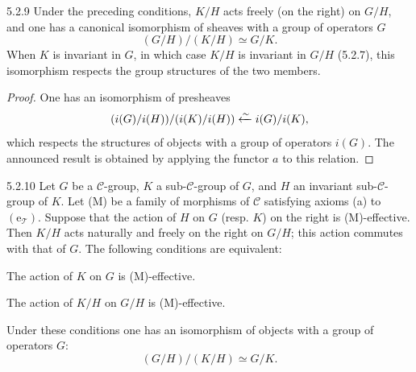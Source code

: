 \begin{proposition}{5.2.9}\label{IV.5.2.9}
Under the preceding conditions, \(K/H\) acts
freely (on the right) on \(G/H\), and one has
a canonical isomorphism of sheaves with a
group of operators \(G\)
\[
(G/H)/(K/H)\simeq G/K.
\]
When \(K\) is invariant in \(G\), in which case
\(K/H\) is invariant in \(G/H\) (5.2.7), this
isomorphism respects the group structures of
the two members.
\end{proposition}
\begin{proof}
One has an isomorphism of presheaves
\[
(i(G)/i(H))/(i(K)/i(H))\xleftarrow{\sim} i(G)/i(K),
\]
which respects the structures of objects with
a group of operators \(i(G)\).
The announced result is obtained by applying
the functor \(a\) to this relation.
\end{proof}
\begin{corollary}{5.2.10}\label{IV.5.2.10}
Let \(G\) be a \(\mathcal C\)-group, \(K\) a
sub-\(\mathcal C\)-group of \(G\), and \(H\)
an invariant sub-\(\mathcal C\)-group of \(K\).
Let (M) be a family of morphisms of \(\mathcal C\)
satisfying axioms (a) to \((\mathrm e_{\mathcal T})\).
Suppose that the action of \(H\) on \(G\)
(resp. \(K\)) on the right is (M)-effective.
Then \(K/H\) acts naturally and freely on
the right on \(G/H\); this action commutes
with that of \(G\). The following conditions are equivalent:
\begin{enumeratei}
\item The action of \(K\) on \(G\) is (M)-effective.
\item The action of \(K/H\) on \(G/H\) is (M)-effective.
\end{enumeratei}
Under these conditions one has an isomorphism
of objects with a group of operators \(G\):
\[
(G/H)/(K/H)\simeq G/K.
\]
\end{corollary}
